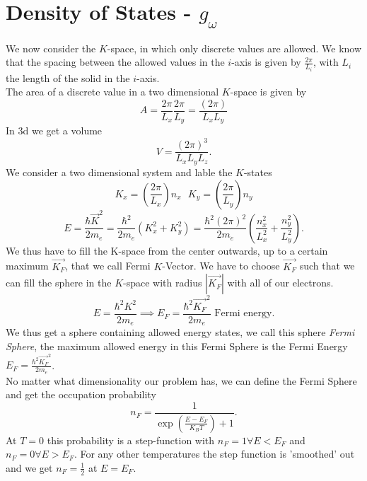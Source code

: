 \documentclass{report}
\begin{document}
\section{Density of States - $g_{\omega}$}
We now consider the $K$-space, in which only discrete values are allowed. We know that the spacing between the allowed values in the $i$-axis is given by $\frac{2\pi}{L_i}$, with $L_i$ the length of the solid in the $i$-axis.\\
The area of a discrete value in a two dimensional $K$-space is given by \[
	A = \frac{2\pi}{L_x} \frac{2\pi}{L_y} = \frac{\left( 2\pi \right) }{L_x L_y}
\] In 3d we get a volume \[
V = \frac{\left( 2\pi \right) ^3}{L_x L_y L_z}
.\] We consider a two dimensional system and lable the $K$-states \[
K_x = \left( \frac{2\pi}{L_x} \right) n_x \text{        } K_y = \left( \frac{2\pi}{L_y} \right) n_y
\] \[
E = \frac{\hbar \vec{K}^2}{2 m_e} = \frac{\hbar^2}{2 m_e} \left( K_x^2 + K_y^2 \right) = \frac{\hbar^2 \left( 2\pi \right) ^2}{2 m_e} \left( \frac{n_x^2}{L_x^2} + \frac{n_y^2}{L_y^2} \right) 
.\] We thus have to fill the K-space from the center outwards, up to a certain maximum $\vec{K_F}$, that we call Fermi $K$-Vector. We have to choose $\vec{K_F}$ such that we can fill the sphere in the $K$-space with radius $|\vec{K_F}|$ with all of our electrons. \[
E= \frac{\hbar^2 K^2}{2m_e} \implies E_F = \frac{\hbar^2 \vec{K_F}^2}{2m_e} \text{ Fermi energy}
.\] We thus get a sphere containing allowed energy states, we call this sphere \emph{Fermi Sphere}, the maximum allowed energy in this Fermi Sphere is the Fermi Energy $E_F = \frac{\hbar^2 \vec{K_F}^2}{2 m_e}$. \\
No matter what dimensionality our problem has, we can define the Fermi Sphere and get the occupation probability \[
	n_F = \frac{1}{\exp\left( \frac{E - E_F}{K_B T} \right) + 1}
.\] At $T =0$ this probability is a step-function with $n_F = 1 \forall E < E_F$ and $n_F = 0 \forall E > E_F$. For any other temperatures the step function is 'smoothed' out and we get $n_F = \frac{1}{2} $ at $E = E_F$.
\end{document}
